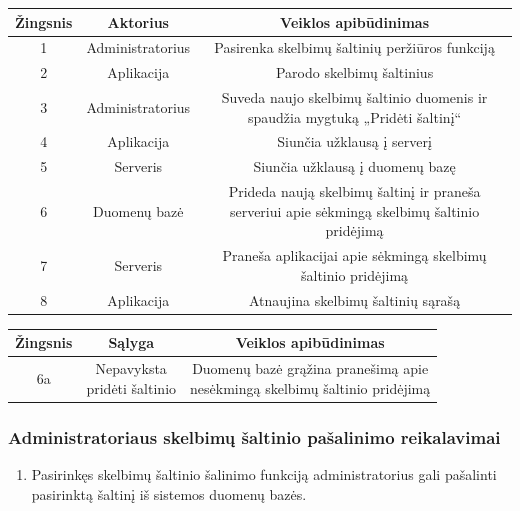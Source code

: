 \documentclass[12pt]{article}
\begin{document}
		\begin{center}
		\begin{tabular}{ | c | c | c | }
			\hline
			Žingsnis & Aktorius         & Veiklos apibūdinimas \\ \hline
			1        & Administratorius & Pasirenka skelbimų šaltinių peržiūros funkciją \\ \hline
			2        & Aplikacija       & Parodo skelbimų šaltinius \\ \hline
			3        & Administratorius & \makecell{Suveda naujo skelbimų šaltinio duomenis ir \\ spaudžia mygtuką „Pridėti šaltinį“ } \\ \hline
			4        & Aplikacija       & Siunčia užklausą į serverį \\ \hline
			5        & Serveris         & Siunčia užklausą į duomenų bazę \\ \hline
			6        & Duomenų bazė     & \makecell{Prideda naują skelbimų šaltinį ir praneša \\ serveriui apie sėkmingą skelbimų šaltinio pridėjimą} \\ \hline
			7        & Serveris         & \makecell{Praneša aplikacijai apie sėkmingą skelbimų \\ šaltinio pridėjimą} \\ \hline
			8        & Aplikacija       & Atnaujina skelbimų šaltinių sąrašą \\ \hline
		\end{tabular}
		\bigskip

		\begin{tabular}{ | c | c | c | }
			\hline
			Žingsnis & Sąlyga         & Veiklos apibūdinimas \\ \hline
			6a       & \makecell{Nepavyksta \\ pridėti šaltinio} & \makecell{Duomenų bazė grąžina pranešimą apie \\ nesėkmingą skelbimų šaltinio pridėjimą} \\ \hline
		\end{tabular}
		\end{center}
	\pagebreak
	
	\subsubsection{Administratoriaus skelbimų šaltinio pašalinimo reikalavimai}
	\begin{enumerate}[labelindent=10pt,leftmargin=2.2cm]
		\item Pasirinkęs skelbimų šaltinio šalinimo funkciją administratorius gali pašalinti pasirinktą šaltinį iš sistemos duomenų bazės. 
	\end{enumerate}
		
\end{document}
